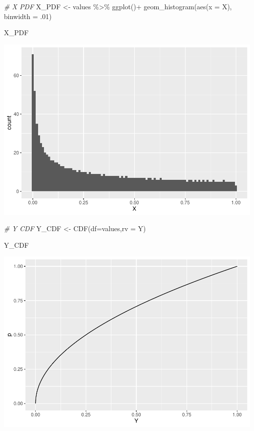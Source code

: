\documentclass[
]{article}
\newenvironment{Shaded}{\begin{snugshade}}{\end{snugshade}}
\newcommand{\AttributeTok}[1]{\textcolor[rgb]{0.77,0.63,0.00}{#1}}
\newcommand{\CommentTok}[1]{\textcolor[rgb]{0.56,0.35,0.01}{\textit{#1}}}
\newcommand{\DecValTok}[1]{\textcolor[rgb]{0.00,0.00,0.81}{#1}}
\newcommand{\FunctionTok}[1]{\textcolor[rgb]{0.00,0.00,0.00}{#1}}
\newcommand{\NormalTok}[1]{#1}
\newcommand{\OtherTok}[1]{\textcolor[rgb]{0.56,0.35,0.01}{#1}}
\newcommand{\SpecialCharTok}[1]{\textcolor[rgb]{0.00,0.00,0.00}{#1}}
\begin{document}
\begin{Shaded}
\begin{Highlighting}[]
  \CommentTok{\# X PDF}
\NormalTok{    X\_PDF }\OtherTok{\textless{}{-}}\NormalTok{ values }\SpecialCharTok{\%\textgreater{}\%} 
      \FunctionTok{ggplot}\NormalTok{()}\SpecialCharTok{+}
      \FunctionTok{geom\_histogram}\NormalTok{(}\FunctionTok{aes}\NormalTok{(}\AttributeTok{x =}\NormalTok{ X), }\AttributeTok{binwidth =}\NormalTok{ .}\DecValTok{01}\NormalTok{)}
    
\NormalTok{    X\_PDF}
\end{Highlighting}
\end{Shaded}

\includegraphics{HW-3_files/figure-latex/unnamed-chunk-1-2.pdf}

\begin{Shaded}
\begin{Highlighting}[]
  \CommentTok{\# Y CDF}
\NormalTok{Y\_CDF }\OtherTok{\textless{}{-}} \FunctionTok{CDF}\NormalTok{(}\AttributeTok{df=}\NormalTok{values,}\AttributeTok{rv =}\NormalTok{ Y)}

\NormalTok{Y\_CDF}
\end{Highlighting}
\end{Shaded}

\includegraphics{HW-3_files/figure-latex/unnamed-chunk-1-3.pdf}
\end{document}
